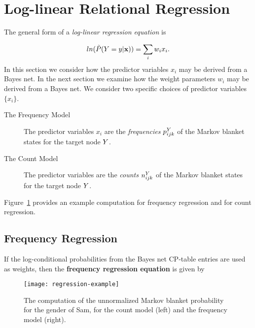 \documentclass[twoside,leqno,twocolumn]{article}
\begin{document}
\section{Log-linear Relational Regression}

The general form of a {\em log-linear regression equation} is

$$ln(\tilde{P}(Y = y|\mathbf{x}))= \sum_{i} w_{i} x_{i}.
$$
In this section we consider how the predictor variables $x_{i}$ may be derived from a Bayes net. In the next section we examine how the weight parameters $w_{i}$ may be derived from a Bayes net.
%
We consider two specific choices of predictor variables $\{x_{i}\}$. 


\begin{description}
\item[The Frequency Model] The predictor variables $x_{i}$ are the {\em frequencies} $p^{Y}_{ijk}$ of the Markov blanket states for the target node $Y$.
\item[The Count Model] The predictor variables are the {\em counts} $n^{Y}_{ijk}$ of the Markov blanket states for the target node $Y$. 
\end{description}

Figure~\ref{fig:regress-example} provides an example computation for frequency regression and for count regression. 

\subsection{Frequency Regression}
If the log-conditional probabilities from the Bayes net CP-table entries are used as weights, then the \textbf{frequency regression equation} is given by



\begin{figure}[t]
\begin{center}
\texttt{[image: regression-example]}
\caption{%
The computation of the unnormalized Markov blanket probability for the gender of Sam, for the count model (left) and the frequency model (right). 
 \label{fig:regress-example}}
\end{center}
\end{figure}
\end{document}
